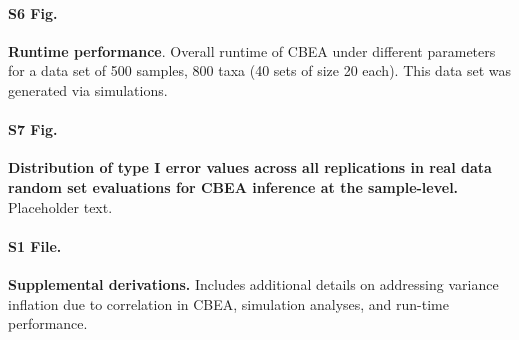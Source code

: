 \documentclass[10pt,letterpaper]{article}
\begin{document}
\paragraph*{S6 Fig.}
\label{S6_Fig}
{\bf Runtime performance}. Overall runtime of CBEA under different parameters for a data set of 500 samples, 800 taxa (40 sets of size 20 each). This data set was generated via simulations.

\paragraph*{S7 Fig.}
\label{S7_Fig}
{\bf Distribution of type I error values across all replications in real data random set evaluations for CBEA inference at the sample-level.} Placeholder text. 

\paragraph*{S1 File.}
\label{S1_File}
{\bf Supplemental derivations.} Includes additional details on addressing variance inflation due to correlation in CBEA, simulation analyses, and run-time performance.
\end{document}
